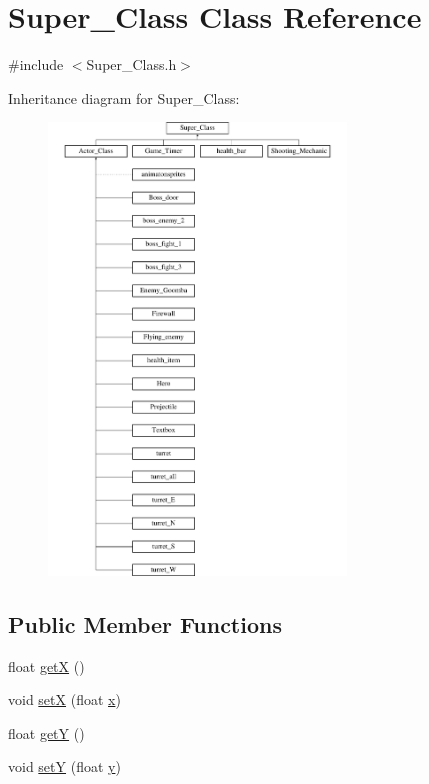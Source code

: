 \hypertarget{class_super___class}{}\section{Super\+\_\+\+Class Class Reference}
\label{class_super___class}


{\ttfamily \#include $<$Super\+\_\+\+Class.\+h$>$}

Inheritance diagram for Super\+\_\+\+Class\+:\begin{figure}[H]
\begin{center}
\leavevmode
\includegraphics[height=12.000000cm]{class_super___class}
\end{center}
\end{figure}
\subsection*{Public Member Functions}
\begin{DoxyCompactItemize}
\item 
float \hyperlink{class_super___class_ad003a78eaa20b2e4b2ab290f2d353829}{getX} ()
\item 
void \hyperlink{class_super___class_a723decaf337e535db49844408911198e}{setX} (float \hyperlink{class_super___class_a6c644a695141db808e5f1227537e3074}{x})
\item 
float \hyperlink{class_super___class_a9d4c62222b9bec910d8e9b600a853329}{getY} ()
\item 
void \hyperlink{class_super___class_a8f67cb1646ea619e9fc69b9c812fec45}{setY} (float \hyperlink{class_super___class_a340cf4d44abcfb96410f02adcb1d9208}{y})
\end{DoxyCompactItemize}
